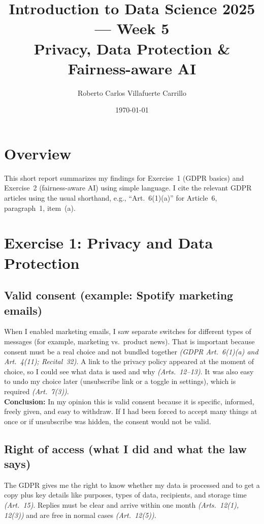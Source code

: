 \documentclass[12pt]{article}
\title{Introduction to Data Science 2025 --- Week 5\\
Privacy, Data Protection \& Fairness-aware AI}
\author{Roberto Carlos Villafuerte Carrillo}
\date{\today}
\begin{document}
\maketitle

\section*{Overview}
This short report summarizes my findings for Exercise~1 (GDPR basics) and Exercise~2 (fairness-aware AI) using simple language. I cite the relevant GDPR articles using the usual shorthand, e.g., ``Art.~6(1)(a)'' for Article~6, paragraph~1, item~(a).

\section{Exercise 1: Privacy and Data Protection}

\subsection{Valid consent (example: Spotify marketing emails)}
When I enabled marketing emails, I saw separate switches for different types of messages (for example, marketing vs.\ product news). That is important because consent must be a real choice and not bundled together \emph{(GDPR Art.~6(1)(a) and Art.~4(11); Recital~32)}. A link to the privacy policy appeared at the moment of choice, so I could see what data is used and why \emph{(Arts.~12--13)}. It was also easy to undo my choice later (unsubscribe link or a toggle in settings), which is required \emph{(Art.~7(3))}.\\

\noindent\textbf{Conclusion:} In my opinion this is valid consent because it is specific, informed, freely given, and easy to withdraw. If I had been forced to accept many things at once or if unsubscribe was hidden, the consent would not be valid.

\subsection{Right of access (what I did and what the law says)}
The GDPR gives me the right to know whether my data is processed and to get a copy plus key details like purposes, types of data, recipients, and storage time \emph{(Art.~15)}. Replies must be clear and arrive within one month \emph{(Arts.~12(1), 12(3))} and are free in normal cases \emph{(Art.~12(5))}.\\
\end{document}
